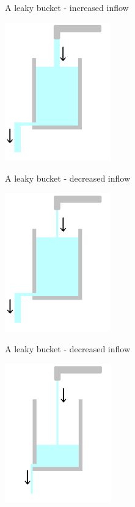 \documentclass{beamer}
\begin{document}
\begin{frame}{A leaky bucket - increased inflow}

  \begin{center}
    \includegraphics[height=6cm]{glass_level_up.png}
  \end{center}
  
  
\end{frame}



\begin{frame}{A leaky bucket - decreased inflow}

  \begin{center}
    \includegraphics[height=6cm]{glass_tap_down.png}
  \end{center}
  
  
\end{frame}



\begin{frame}{A leaky bucket - decreased inflow}

  \begin{center}
    \includegraphics[height=6cm]{glass_level_down.png}
  \end{center}
  
\end{frame}
\end{document}
